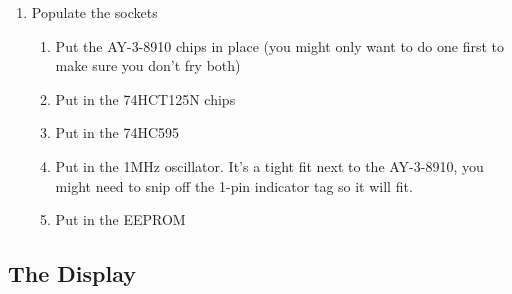\documentclass[11pt]{article}
\begin{document}
\begin{enumerate}
\item Populate the sockets
	\begin{enumerate}
		\item Put the AY-3-8910 chips in place 
			(you might only want to do one first
			to make sure you don't fry both)
		\item Put in the 74HCT125N chips
		\item Put in the 74HC595
		\item Put in the 1MHz oscillator.  It's a tight fit next to the AY-3-8910,
			you might need to snip off the 1-pin indicator tag so it will fit.
		\item Put in the EEPROM
	\end{enumerate}
\end{enumerate}


		


\subsection{The Display}
\end{document}
